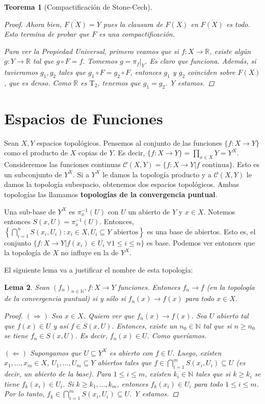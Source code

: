 \documentclass[12pt]{book}
\newtheorem{teo}{Teorema}[section]
\newtheorem{lem}[teo]{Lema}
\theoremstyle{definition}
\newcommand{\RR}{\mathbb{R}}      %
\newcommand{\NN}{\mathbb{N}}
\begin{document}
\begin{teo}[Compactificación de Stone-Cech]
\begin{proof}
Ahora bien, $\overline{F(X)}=Y$ pues la clausura de $F(X)$ en $\overline{F(X)}$ es todo. Esto termina de probar que $F$ es una compactificación.

Para ver la Propiedad Universal, primero veamos que si $f:X\to\RR$, existe algún $g:Y\to\RR$ tal que $g\circ F = f$. Tomemos $g=\left.\pi_f\right|_Y$. Es claro que funciona. Además, si tuvieramos $g_1,g_2$ tales que $g_1\circ F = g_2\circ F$, entonces $g_1$ y $g_2$ coinciden sobre $F(X)$, que es denso. Como $\RR$ es $\mathrm{T}_2$, tenemos que $g_1=g_2$. Y estamos. 
\end{proof}
\end{teo}

\section{Espacios de Funciones}

Sean $X,Y$ espacios topológicos. Pensemos al conjunto de las funciones $\{f:X\to Y\}$ como el producto de $X$ copias de $Y$. Es decir, $\{f:X\to Y\} = \displaystyle\prod_{x\in X}Y = Y^X$. Consideremos las funciones continuas $\mathscr{C}(X,Y)=\{f:X\to Y | f\text{ continua}\}$. Esto es un subconjunto de $Y^X$. Si a $Y^X$ le damos la topología producto y a $\mathscr{C}(X,Y)$ le damos la topología subespacio, obtenemos dos espacios topológicos. Ambas topologías las llamamos \textbf{topologías de la convergencia puntual}.

Una sub-base de $Y^X$ es $\pi_x^{-1}(U)$ con $U$ un abierto de $Y$ y $x\in X$. Notemos entonces $S(x,U)=\pi_x^{-1}(U)$. Entonces, $\left\{\displaystyle\bigcap_{i=1}^n S(x_i,U_i) : x_i\in X, U_i\subseteq Y \text{ abiertos} \right\}$ es una base de abiertos. Esto es, el conjunto $\{f:X\to Y | f(x_i) \in U_i \;\forall 1\leq i\leq n\}$ es base. Podemos ver entonces que la topología de $X$ no influye en la de $Y^X$.

El siguiente lema va a justificar el nombre de esta topología:
\begin{lem}
Sean $(f_n)_{n\in\NN},f:X\to Y$ funciones. Entonces $f_n\to f$ (en la topología de la convergencia puntual) si y sólo si $f_n(x)\to f(x)$ para todo $x\in X$.
\begin{proof}
$(\Longrightarrow)$ Sea $x\in X$. Quiero ver que $f_n(x)\to f(x)$. Sea $U$ abierto tal que $f(x)\in U$ y así $f\in S(x,U)$. Entonces, existe un $n_0\in\NN$ tal que si $n\geq n_0$ se tiene $f_n\in S(x,U)$. Es decir, $f_n(x)\in U$. Como queríamos.

$(\Longleftarrow)$ Supongamos que $U\subseteq Y^X$ es abierto con $f\in U$. Luego,  existen $x_1,\ldots ,x_m\in X$, $U_1,\ldots, U_m\subseteq Y$ abiertos tales que $f\in \displaystyle\bigcap_{i=1}^m S(x_i,U_i)\subseteq U$ (es decir, un abierto de la base). Para $1\leq i\leq m$, existen $k_i\in\NN$ tales que si $k\geq k_i$ se tiene $f_{k}(x_i)\in U_i$. Si $k\geq k_1,\ldots, k_m$, entonces $f_k(x_i)\in U_i$ para todo $1\leq i\leq m$. Por lo tanto, $f_k\in\displaystyle\bigcap_{i=1}^m S(x_i,U_i)\subseteq U$. Y estamos.
\end{proof}
\end{lem}
\end{document}
